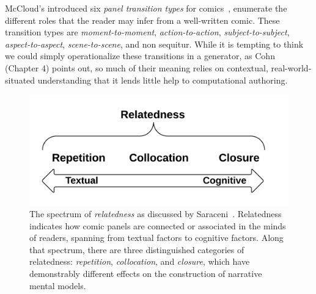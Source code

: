 McCloud's introduced six {\em
panel transition types} for comics~\cite{mcCloud1993understanding}, 
enumerate the different roles that the reader may infer from a
well-written comic. These transition types are {\em moment-to-moment}, {\em
action-to-action}, {\em subject-to-subject}, {\em aspect-to-aspect}, {\em
scene-to-scene}, and non sequitur. While it is tempting to think we could
simply operationalize these transitions in a generator, as
Cohn~\cite{cohn2013visual} (Chapter 4) points out, so much of their meaning
relies on contextual, real-world-situated understanding that it lends
little help to computational authoring.

%
\begin{figure}
	\centering
	\includegraphics[width=0.75\columnwidth]{relatedness.png}
	\caption{
		The spectrum of \emph{relatedness} as discussed by
                Saraceni~\cite{saraceni2016relatedness}. Relatedness indicates how 
		comic panels are connected or associated in the minds of 
		readers, spanning from textual factors to cognitive factors. 
		Along that spectrum, there are three  distinguished 
		categories of relatedness: \emph{repetition}, 
		\emph{collocation}, and \emph{closure}, which have
		demonstrably different effects on the construction of
		narrative mental models.
		}
	\label{figure:relatedness}
\end{figure}
%

